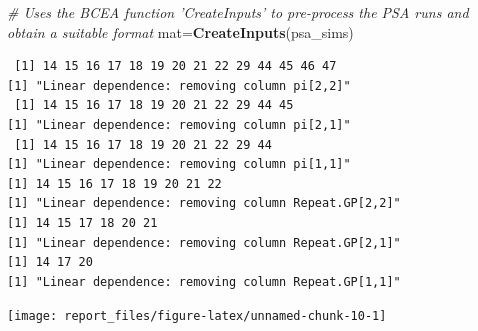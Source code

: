 \documentclass[]{article}
\newenvironment{Shaded}{\begin{snugshade}}{\end{snugshade}}
\newcommand{\CommentTok}[1]{\textcolor[rgb]{0.56,0.35,0.01}{\textit{#1}}}
\newcommand{\ControlFlowTok}[1]{\textcolor[rgb]{0.13,0.29,0.53}{\textbf{#1}}}
\newcommand{\DataTypeTok}[1]{\textcolor[rgb]{0.13,0.29,0.53}{#1}}
\newcommand{\DecValTok}[1]{\textcolor[rgb]{0.00,0.00,0.81}{#1}}
\newcommand{\KeywordTok}[1]{\textcolor[rgb]{0.13,0.29,0.53}{\textbf{#1}}}
\newcommand{\NormalTok}[1]{#1}
\newcommand{\OperatorTok}[1]{\textcolor[rgb]{0.81,0.36,0.00}{\textbf{#1}}}
\begin{document}
\begin{Shaded}
\begin{Highlighting}[]
\CommentTok{# Uses the BCEA function 'CreateInputs' to pre-process the PSA runs and obtain a suitable format}
\NormalTok{mat=}\KeywordTok{CreateInputs}\NormalTok{(psa_sims)}
\end{Highlighting}
\end{Shaded}

\begin{verbatim}
 [1] 14 15 16 17 18 19 20 21 22 29 44 45 46 47
[1] "Linear dependence: removing column pi[2,2]"
 [1] 14 15 16 17 18 19 20 21 22 29 44 45
[1] "Linear dependence: removing column pi[2,1]"
 [1] 14 15 16 17 18 19 20 21 22 29 44
[1] "Linear dependence: removing column pi[1,1]"
[1] 14 15 16 17 18 19 20 21 22
[1] "Linear dependence: removing column Repeat.GP[2,2]"
[1] 14 15 17 18 20 21
[1] "Linear dependence: removing column Repeat.GP[2,1]"
[1] 14 17 20
[1] "Linear dependence: removing column Repeat.GP[1,1]"
\end{verbatim}

\begin{Shaded}
\end{Shaded}

\begin{center}\texttt{[image: report\_files/figure-latex/unnamed-chunk-10-1]} \end{center}

\begin{Shaded}
\end{Shaded}
\end{document}
